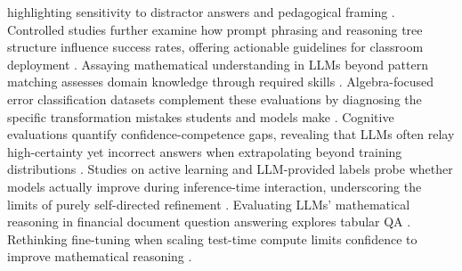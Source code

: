 \documentclass[acmsmall,anonymous]{acmart}
\begin{document}
highlighting sensitivity to distractor answers and pedagogical framing \cite{liu-2023-novice-expert}.  Controlled studies further examine how prompt phrasing and reasoning tree structure influence success rates, offering actionable guidelines for classroom deployment \cite{jie-2023-design-cot,chang-2023-rocling-math}. Assaying mathematical understanding in LLMs beyond pattern matching assesses domain knowledge through required skills \cite{guo2024learning}.  Algebra-focused error classification datasets complement these evaluations by diagnosing the specific transformation mistakes students and models make \cite{ni-2023-algebra-error}.  Cognitive evaluations quantify confidence-competence gaps, revealing that LLMs often relay high-certainty yet incorrect answers when extrapolating beyond training distributions \cite{singh-2023-confidence-gap}.  Studies on active learning and LLM-provided labels probe whether models actually improve during inference-time interaction, underscoring the limits of purely self-directed refinement \cite{chen-2024-active-learning-llm}. Evaluating LLMs' mathematical reasoning in financial document question answering explores tabular QA \cite{srivastava2024evaluating}. Rethinking fine-tuning when scaling test-time compute limits confidence to improve mathematical reasoning \cite{chen2025a}.
\end{document}
